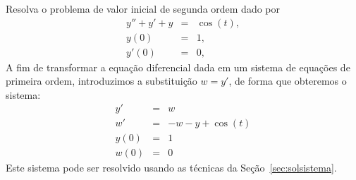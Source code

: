 \begin{ex} Resolva o problema de valor inicial de segunda ordem dado por
\begin{eqnarray}
y''+y'+y&=&\cos(t),\\
y(0)&=&1,\\
y'(0)&=&0,
\end{eqnarray}
A fim de transformar a equação diferencial dada em um sistema de equações de primeira ordem, introduzimos a substituição $w=y'$, de forma que obteremos o sistema:
\begin{eqnarray}
y'&=&w\\
w'&=&-w-y+\cos(t)\\
y(0)&=&1\\
w(0)&=&0
\end{eqnarray}
Este sistema pode ser resolvido usando as técnicas da Seção~\ref{sec:solsistema}.
\end{ex}

